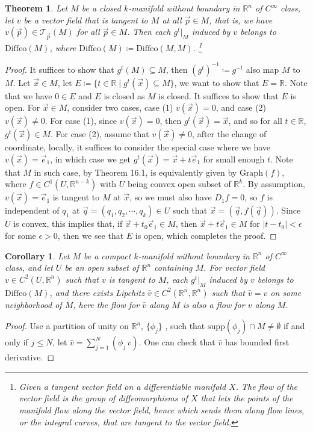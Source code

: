 \documentclass[15pt]{book}
\theoremstyle{break}
\theoremstyle{break}
\newtheorem{thm}{Theorem}[section]
\newtheorem{corT}[lem]{Corollary}
\newcommand{\R}{\mathbb{R}}
\newcommand{\T}{\mathcal{T}}
\newcommand{\supp}{\text{supp}}
\begin{document}
\begin{thm}
Let $M$ be a closed $k$-manifold without boundary in $\R^n$ of $C^\infty$ class, let $v$ be a vector field that is tangent to $M$ at all $\vec{p}\in M$, that is, we have $v(\vec{p}) \in \T_{\vec{p}}(M)$ for all $\vec{p}\in M$. Then each $g^t|_M$ induced by $v$ belongs to $\text{Diffeo}(M)$, where $\text{Diffeo}(M) \coloneqq \text{Diffeo}(M,M)$.  \footnote{Given a tangent vector field on a differentiable manifold $X$. The flow of the vector field is the group of diffeomorphisms of $X$ that lets the points of the manifold flow along the vector field, hence which sends them along flow lines, or the integral curves, that are tangent to the vector field.}
\end{thm}
\begin{proof}
It suffices to show that $g^t(M) \subseteq M$, then $(g^t)^{-1}\coloneqq g^{-t}$ also map $M$ to $M$. Let $\vec{x} \in M$, let $E \coloneqq \{ t\in \R \mid g^t(\vec{x})\subseteq M\}$, we want to show that $E = \R$. Note that we have $0 \in E$ and $E$ is closed as $M$ is closed. It suffices to show that $E$ is open. For $\vec{x}\in M$, consider two cases, case (1) $v(\vec{x}) = 0$, and case (2) $v(\vec{x})\neq 0$. For case (1), since $v(\vec{x}) = 0$, then  $g^t(\vec{x}) = \vec{x}$, and so for all $t \in \R$, $g^t(\vec{x}) \in M$. For case (2), assume that $v(\vec{x})\neq 0$, after the change of coordinate, locally, it suffices to consider the special case where we have $v(\vec{x}) = \vec{e}_1$, in which case we get $g^t(\vec{x}) = \vec{x}+ t\vec{e}_1$ for small enough $t$. Note that $M$ in such case, by Theorem 16.1, is equivalently given by $\text{Graph}(f)$, where $f \in C^1(U,\R^{n-k})$ with $U$ being convex open subset of $\R^k$. By assumption, $v(\vec{x}) = \vec{e}_1$ is tangent to $M$ at $\vec{x}$, so we must also have $D_1 f = 0$, so $f$ is independent of $q_1$ at $\vec{q}=(q_1,q_2,\cdots, q_k) \in U$ such that $\vec{x} = (\vec{q},f(\vec{q}))$. Since $U$ is convex, this implies that, if $\vec{x}+t_0 \vec{e}_1 \in M$, then $\vec{x}+t\vec{e}_1  \in M$ for $|t-t_0|<\epsilon$ for some $\epsilon>0$, then we see that $E$ is open, which completes the proof.
\end{proof}

\begin{corT}
Let $M$ be a compact $k$-manifold without boundary in $\R^n$ of $C^\infty$ class, and let $U$ be an open subset of $\R^n$ containing $M$. For vector field $v \in C^2(U, \R^n)$ such that $v$ is tangent to $M$, each $g^t|_M$ induced by $v$ belongs to $\text{Diffeo}(M)$, and there exists Lipchitz $\hat{v} \in C^2(\R^n, \R^n)$ such that $\hat{v} = v$ on some neighborhood of $M$, here the flow for $\hat{v}$ along $M$ is also a flow for $v$ along $M$.
\end{corT}
\begin{proof}
Use a partition of unity on $\R^n$, $\{\phi_j\}$ , such that $\supp(\phi_j) \cap M \neq \emptyset$ if and only if $j \leq N$, let $\hat{v} = \sum_{j=1}^N (\phi_j \, v)$. One can check that $\hat{v}$ has bounded first derivative.
\end{proof}
\end{document}
